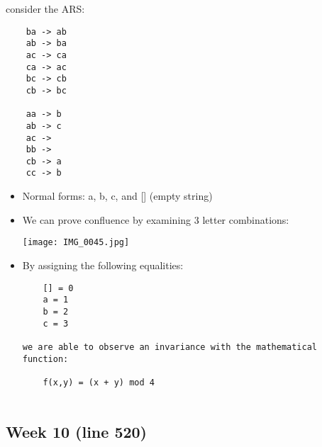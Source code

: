 \documentclass{article}
\theoremstyle{theorem}
\theoremstyle{definition}
\theoremstyle{remark}
\begin{document}
consider the ARS:
\begin{verbatim}
    ba -> ab
    ab -> ba
    ac -> ca
    ca -> ac
    bc -> cb
    cb -> bc
 
    aa -> b
    ab -> c
    ac ->  
    bb ->
    cb -> a
    cc -> b
\end{verbatim}  
\begin{itemize}
\item Normal forms: a, b, c, and [] (empty string)

\item We can prove confluence by examining 3 letter combinations:

\texttt{[image: IMG\_0045.jpg]}

\item By assigning the following equalities:
\begin{verbatim}
    [] = 0
    a = 1
    b = 2
    c = 3

we are able to observe an invariance with the mathematical function:
    
    f(x,y) = (x + y) mod 4
    
\end{verbatim}

\end{itemize}

\subsection{Week 10 (line 520)}
\end{document}
